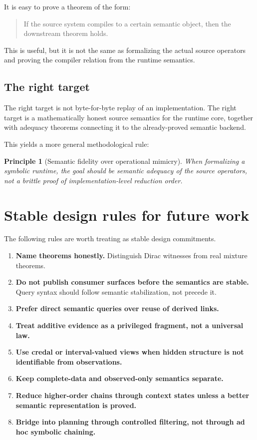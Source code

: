 \documentclass[11pt]{article}
\newtheorem{principle}{Principle}
\begin{document}
It is easy to prove a theorem of the form:
\begin{quote}
If the source system compiles to a certain semantic object, then the downstream
theorem holds.
\end{quote}
This is useful, but it is not the same as formalizing the actual source
operators and proving the compiler relation from the runtime semantics.

\subsection{The right target}

The right target is not byte-for-byte replay of an implementation.  The right
target is a mathematically honest source semantics for the runtime core,
together with adequacy theorems connecting it to the already-proved semantic
backend.

This yields a more general methodological rule:
\begin{principle}[Semantic fidelity over operational mimicry]
When formalizing a symbolic runtime, the goal should be semantic adequacy of the
source operators, not a brittle proof of implementation-level reduction order.
\end{principle}

\section{Stable design rules for future work}

The following rules are worth treating as stable design commitments.

\begin{enumerate}
  \item \textbf{Name theorems honestly.}  Distinguish Dirac witnesses from real
        mixture theorems.
  \item \textbf{Do not publish consumer surfaces before the semantics are
        stable.}  Query syntax should follow semantic stabilization, not
        precede it.
  \item \textbf{Prefer direct semantic queries over reuse of derived links.}
  \item \textbf{Treat additive evidence as a privileged fragment, not a
        universal law.}
  \item \textbf{Use credal or interval-valued views when hidden structure is
        not identifiable from observations.}
  \item \textbf{Keep complete-data and observed-only semantics separate.}
  \item \textbf{Reduce higher-order chains through context states unless a
        better semantic representation is proved.}
  \item \textbf{Bridge into planning through controlled filtering, not through
        ad hoc symbolic chaining.}
\end{enumerate}
\end{document}
